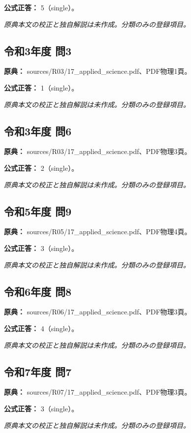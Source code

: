 \textbf{公式正答：} 5（single）。

\par\textit{原典本文の校正と独自解説は未作成。分類のみの登録項目。}

\subsection{令和3年度 問3}
\label{q:r03-reg-applied-03}

\noindent\textbf{原典：} sources/R03/17\_applied\_science.pdf、PDF物理1頁。

\textbf{公式正答：} 1（single）。

\par\textit{原典本文の校正と独自解説は未作成。分類のみの登録項目。}

\subsection{令和3年度 問6}
\label{q:r03-reg-applied-06}

\noindent\textbf{原典：} sources/R03/17\_applied\_science.pdf、PDF物理3頁。

\textbf{公式正答：} 2（single）。

\par\textit{原典本文の校正と独自解説は未作成。分類のみの登録項目。}

\subsection{令和5年度 問9}
\label{q:r05-reg-applied-09}

\noindent\textbf{原典：} sources/R05/17\_applied\_science.pdf、PDF物理4頁。

\textbf{公式正答：} 3（single）。

\par\textit{原典本文の校正と独自解説は未作成。分類のみの登録項目。}

\subsection{令和6年度 問8}
\label{q:r06-reg-applied-08}

\noindent\textbf{原典：} sources/R06/17\_applied\_science.pdf、PDF物理3頁。

\textbf{公式正答：} 4（single）。

\par\textit{原典本文の校正と独自解説は未作成。分類のみの登録項目。}

\subsection{令和7年度 問7}
\label{q:r07-reg-applied-07}

\noindent\textbf{原典：} sources/R07/17\_applied\_science.pdf、PDF物理3頁。

\textbf{公式正答：} 3（single）。

\par\textit{原典本文の校正と独自解説は未作成。分類のみの登録項目。}
